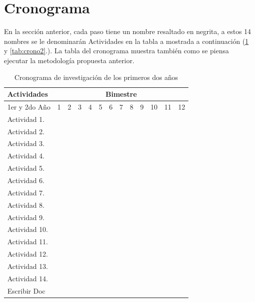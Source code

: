 \documentclass[12pt,twoside,onecolumn,letterpaper]{article}
\begin{document}
\section{Cronograma}
\label{sec:cronograma}
En la secci\'on anterior, cada paso tiene un nombre resaltado en negrita, a estos 14 nombres se le denominar\'an Actividades en la tabla a mostrada a continuaci\'on (\tablename  \ref{tab:crono} y \ref{tab:crono2}.). La tabla del cronograma muestra también como se piensa ejecutar la metodolog\'ia propuesta anterior.\par
\begin{table}[!htb]
  \centering
  \newcommand{\Bk}{\multicolumn{1}{G}{ }}
  \begin{tabular}{|p{3.0cm}||c|c|c|c|c|c|c|c|c|c|c|c|}\hline
    Actividades&\multicolumn{12}{|c|}{Bimestre}\\\hline\hline
    1er y  2do A\~no&1&2 &3  &4  &5  &6  &7  &8  &9  &10 &11 &12 \\\hline
    Actividad 1. &\Bk&   &   &   &   &\Bk&   &   &   &\Bk&   &   \\\hline
    Actividad 2. &\Bk&\Bk&   &   &\Bk&\Bk&   &\Bk&\Bk&\Bk&\Bk&\Bk\\\hline
    Actividad 3. &   &\Bk&   &   &\Bk&\Bk&   &\Bk&\Bk&\Bk&\Bk&\Bk\\\hline
    Actividad 4. &   &\Bk&   &   &   &\Bk&\Bk&\Bk&\Bk&\Bk&\Bk&\Bk\\\hline
    Actividad 5. &\Bk&   &   &\Bk&   &\Bk&   &   &   &\Bk&   &   \\\hline
    Actividad 6. &\Bk&   &   &\Bk&   &\Bk&   &   &   &\Bk&   &   \\\hline
    Actividad 7. &   &   &\Bk&\Bk&\Bk&   &\Bk&\Bk&\Bk&   &\Bk&\Bk\\\hline
    Actividad 8. &   &\Bk&   &\Bk&   &\Bk&   &   &   &\Bk&   &   \\\hline
    Actividad 9. &   &   &   &\Bk&   &   &\Bk&\Bk&\Bk&   &\Bk&\Bk\\\hline
    Actividad 10.&   &   &\Bk&\Bk&\Bk&   &\Bk&\Bk&\Bk&   &\Bk&\Bk\\\hline
    Actividad 11.&   &   &\Bk&\Bk&\Bk&   &\Bk&\Bk&\Bk&   &\Bk&\Bk\\\hline
    Actividad 12.&   &   &   &   &\Bk&   &   &\Bk&\Bk&   &\Bk&\Bk\\\hline
    Actividad 13.&   &   &   &   &   &   &   &   &   &   &   &   \\\hline
    Actividad 14.&   &   &   &   &   &   &   &   &   &   &   &   \\\hline
    Escribir Doc &   &\Bk&   &\Bk&   &\Bk&   &\Bk&   &\Bk&   &\Bk\\\hline    
  \end{tabular}
  \caption{Cronograma de investigaci\'on de los primeros dos a\~nos}
  \label{tab:crono}
\end{table}
\end{document}
